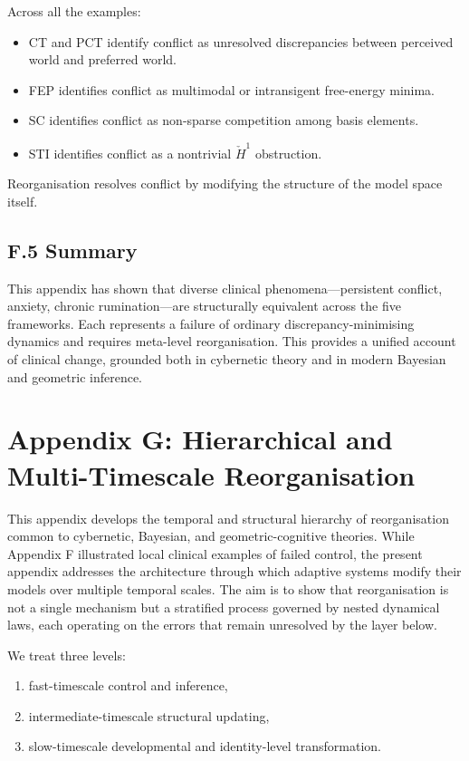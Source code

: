 \documentclass[11pt,a4paper,twoside]{article}
\begin{document}
Across all the examples:
\begin{itemize}
    \item CT and PCT identify conflict as unresolved discrepancies between perceived world and preferred world.
    \item FEP identifies conflict as multimodal or intransigent free-energy minima.
    \item SC identifies conflict as non-sparse competition among basis elements.
    \item STI identifies conflict as a nontrivial $\check{H}^1$ obstruction.
\end{itemize}

Reorganisation resolves conflict by modifying the structure of the model space itself.

\subsection*{F.5 Summary}

This appendix has shown that diverse clinical phenomena—persistent conflict, anxiety, chronic rumination—are structurally equivalent across the five frameworks. Each represents a failure of ordinary discrepancy-minimising dynamics and requires meta-level reorganisation. This provides a unified account of clinical change, grounded both in cybernetic theory and in modern Bayesian and geometric inference.

\section*{Appendix G: Hierarchical and Multi-Timescale Reorganisation}

This appendix develops the temporal and structural hierarchy of reorganisation common to cybernetic, Bayesian, and geometric-cognitive theories. While Appendix F illustrated local clinical examples of failed control, the present appendix addresses the architecture through which adaptive systems modify their models over multiple temporal scales. The aim is to show that reorganisation is not a single mechanism but a stratified process governed by nested dynamical laws, each operating on the errors that remain unresolved by the layer below.

We treat three levels:
\begin{enumerate}
    \item fast-timescale control and inference,
    \item intermediate-timescale structural updating,
    \item slow-timescale developmental and identity-level transformation.
\end{enumerate}
\end{document}

